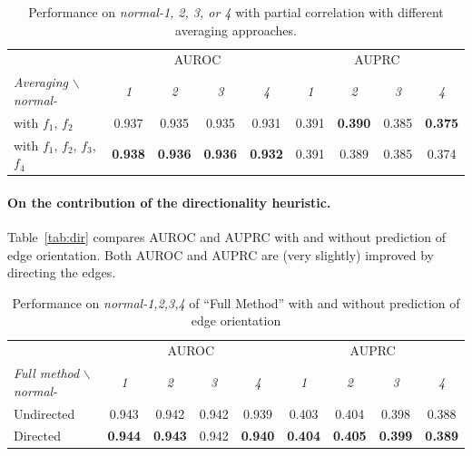 \documentclass[wcp]{jmlr}
\begin{document}
\begin{table}[ht]
\caption{Performance on \textit{normal-1, 2, 3, or 4} with partial correlation with different averaging approaches.}
\label{tab:f3f4}
\centering
\small
\begin{tabular}{| l | c c c c | c c c c |}
\hline
& \multicolumn{4}{c|}{AUROC} & \multicolumn{4}{c|}{AUPRC} \\
\textit{Averaging} $\backslash$ \textit{normal-} & \textit{1} & \textit{2} & \textit{3} & \textit{4} & \textit{1} & \textit{2} & \textit{3} & \textit{4} \\
\hline
\hline
 with $f_1$, $f_2$ & 0.937 & 0.935 & 0.935 & 0.931 & 0.391 &  \textbf{0.390} &  0.385 & \textbf{0.375}  \\
 with $f_1$, $f_2$, $f_3$, $f_4$ & \textbf{0.938} & \textbf{0.936} & \textbf{0.936} & \textbf{0.932} & 0.391 & 0.389 & 0.385 & 0.374\\
\hline
\end{tabular}
\end{table}

\paragraph{On the contribution of the directionality heuristic.}

Table~\ref{tab:dir} compares AUROC and AUPRC with and without prediction
of edge orientation. Both AUROC and AUPRC are (very slightly) improved by
directing the edges.

\begin{table}[ht]\label{tab:dir}
\caption{Performance on \textit{normal-1,2,3,4} of ``Full Method'' with and
  without prediction of edge orientation}
\label{tab:directivity}

\centering
\small
\begin{tabular}{| l | c c c c | c c c c |}
\hline
& \multicolumn{4}{c|}{AUROC} & \multicolumn{4}{c|}{AUPRC} \\
\textit{Full method} $\backslash$ \textit{normal-} & \textit{1} & \textit{2} & \textit{3} & \textit{4} & \textit{1} & \textit{2} & \textit{3} & \textit{4} \\
\hline
\hline
 Undirected & 0.943 & 0.942 & 0.942 & 0.939 & 0.403 & 0.404 & 0.398 & 0.388  \\
  Directed & \textbf{0.944} & \textbf{0.943} & 0.942 & \textbf{0.940} & \textbf{0.404} & \textbf{0.405} & \textbf{0.399} & \textbf{0.389}\\
\hline
\end{tabular}
\end{table}
\end{document}
